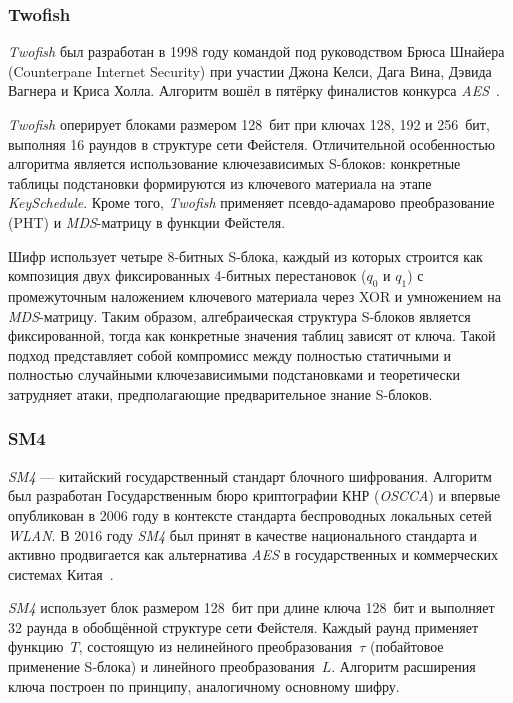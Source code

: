 \subsubsection{Twofish}

\textit{Twofish} был разработан в 1998 году командой под руководством Брюса Шнайера
(Counterpane Internet Security) при участии Джона Келси, Дага Вина,
Дэвида Вагнера и Криса Холла. Алгоритм вошёл в пятёрку финалистов конкурса
\textit{AES}~\cite{twofish1998}.

\textit{Twofish} оперирует блоками размером 128~бит при ключах 128, 192 и 256~бит,
выполняя 16 раундов в структуре сети Фейстеля. Отличительной особенностью
алгоритма является использование ключезависимых S-блоков: конкретные таблицы
подстановки формируются из ключевого материала на этапе \textit{KeySchedule}.
Кроме того, \textit{Twofish} применяет псевдо-адамарово преобразование (PHT)
и \textit{MDS}-матрицу в функции Фейстеля.

Шифр использует четыре 8-битных S-блока, каждый из которых строится как
композиция двух фиксированных 4-битных перестановок ($q_0$ и $q_1$)
с промежуточным наложением ключевого материала через XOR и умножением на
\textit{MDS}-матрицу. Таким образом, алгебраическая структура S-блоков является
фиксированной, тогда как конкретные значения таблиц зависят от ключа.
Такой подход представляет собой компромисс между полностью статичными
и полностью случайными ключезависимыми подстановками и теоретически затрудняет
атаки, предполагающие предварительное знание S-блоков.

\subsubsection{SM4}

\textit{SM4} — китайский государственный стандарт блочного шифрования. Алгоритм
был разработан Государственным бюро криптографии КНР (\textit{OSCCA}) и впервые
опубликован в 2006 году в контексте стандарта беспроводных локальных
сетей \textit{WLAN}. В 2016 году \textit{SM4} был принят в качестве национального
стандарта и активно продвигается как альтернатива \textit{AES}
в государственных и коммерческих системах Китая~\cite{sm4_2006}.

\textit{SM4} использует блок размером 128~бит при длине ключа 128~бит и выполняет
32 раунда в обобщённой структуре сети Фейстеля. Каждый раунд применяет
функцию~$T$, состоящую из нелинейного преобразования~$\tau$ (побайтовое
применение S-блока) и линейного преобразования~$L$. Алгоритм расширения
ключа построен по принципу, аналогичному основному шифру.



